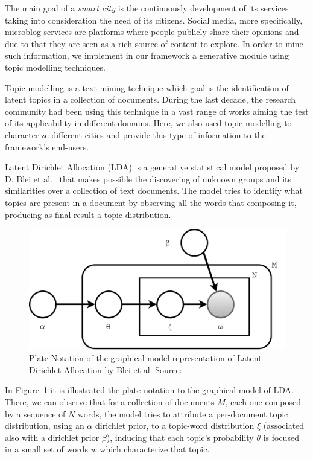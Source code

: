 The main goal of a \textit{smart city} is the continuously development of its services taking into consideration the need of its citizens. Social media, more specifically, microblog services are platforms where people publicly share their opinions and due to that they are seen as a rich source of content to explore. In order to mine such information, we implement in our framework a generative module using topic modelling techniques.

Topic modelling is a text mining technique which goal is the identification of latent topics in a collection of documents. During the last decade, the research community had been using this technique in a vast range of works aiming the test of its applicability in different domains. Here, we also used topic modelling to characterize different cities and provide this type of information to the framework's end-users.

Latent Dirichlet Allocation (\gls{LDA}) is a generative statistical model proposed by D. Blei et al.~\cite{blei2003latent} that makes possible the discovering of unknown groups and its similarities over a collection of text documents. The model tries to identify what topics are present in a document by observing all the words that composing it, producing as final result a topic distribution. 

\begin{figure}[htbp]
	\centering
	\includegraphics[scale=0.41, keepaspectratio]{figures/lda-model.pdf}
	\caption[Plate notation of \gls{LDA} by Blei et al. ~\cite{blei2003latent}]{Plate Notation of the graphical model representation of Latent Dirichlet Allocation by Blei et al. Source:~\cite{blei2003latent}}
	\label{fig:lda_graphical_model_representation}
\end{figure}

In Figure~\ref{fig:lda_graphical_model_representation} it is illustrated the plate notation to the graphical model of \gls{LDA}. There, we can observe that for a collection of documents $M$, each one composed by a sequence of $N$ words, the model tries to attribute a per-document topic distribution, using an $\alpha$ dirichlet prior, to a topic-word distribution $\xi$ (associated also with a dirichlet prior $\beta$), inducing that each topic's probability $\theta$ is focused in a small set of words $w$ which characterize that topic.

